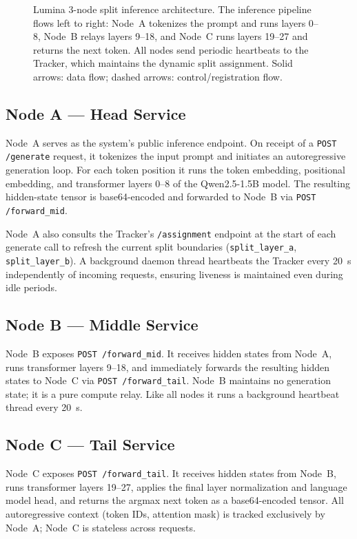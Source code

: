 \documentclass[conference]{IEEEtran}
\begin{document}
\begin{figure}[t]
\begin{tikzpicture}
\end{tikzpicture}
\caption{Lumina 3-node split inference architecture. The inference pipeline flows
left to right: Node~A tokenizes the prompt and runs layers 0--8, Node~B relays
layers 9--18, and Node~C runs layers 19--27 and returns the next token.
All nodes send periodic heartbeats to the Tracker, which maintains the dynamic
split assignment. Solid arrows: data flow; dashed arrows: control/registration flow.}
\label{fig:arch}
\end{figure}

\subsection{Node A --- Head Service}

Node~A serves as the system's public inference endpoint. On receipt of a
\texttt{POST /generate} request, it tokenizes the input prompt and initiates
an autoregressive generation loop. For each token position it runs the token
embedding, positional embedding, and transformer layers 0--8 of the
Qwen2.5-1.5B model. The resulting hidden-state tensor is base64-encoded and
forwarded to Node~B via \texttt{POST /forward\_mid}.

Node~A also consults the Tracker's \texttt{/assignment} endpoint at the start
of each generate call to refresh the current split boundaries
(\texttt{split\_layer\_a}, \texttt{split\_layer\_b}). A background daemon
thread heartbeats the Tracker every 20~s independently of incoming requests,
ensuring liveness is maintained even during idle periods.

\subsection{Node B --- Middle Service}

Node~B exposes \texttt{POST /forward\_mid}. It receives hidden states from
Node~A, runs transformer layers 9--18, and immediately forwards the resulting
hidden states to Node~C via \texttt{POST /forward\_tail}. Node~B maintains no
generation state; it is a pure compute relay. Like all nodes it runs a
background heartbeat thread every 20~s.

\subsection{Node C --- Tail Service}

Node~C exposes \texttt{POST /forward\_tail}. It receives hidden states from
Node~B, runs transformer layers 19--27, applies the final layer normalization
and language model head, and returns the argmax next token as a base64-encoded
tensor. All autoregressive context (token IDs, attention mask) is tracked
exclusively by Node~A; Node~C is stateless across requests.
\end{document}
